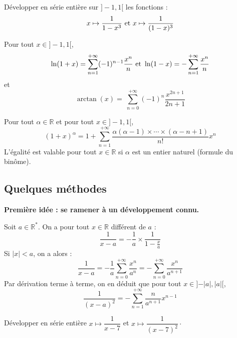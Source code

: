 \documentclass[french,11pt,twoside]{VcCours}
\begin{document}
\begin{ApplicationDirecte}{} Développer en série entière sur $]-1,1[$ les fonctions :
$$ x \mapsto \dfrac{1}{1-x^3} \hbox{ et } x \mapsto \dfrac{1}{(1-x)^3}$$
\end{ApplicationDirecte}

\begin{Proposition}{} Pour tout $x \in ]-1,1[$,
$$ \ln(1+x) = \sum_{n=1}^{+ \infty} (-1)^{n-1} \dfrac{x^n}{n} \hbox{ et } \ln(1-x) = -\sum_{n=1}^{+ \infty} \dfrac{x^n}{n}$$
et 
$$ \arctan(x)= \ \sum_{n=0}^{+ \infty} (-1)^n \frac{x^{2n+1}}{2n+1} $$
\end{Proposition}

\begin{Demonstration}{}
\vspace{7.5cm}
\end{Demonstration}

\begin{Theoreme}{} Pour tout $\alpha \in \mathbb{R}$ et pour tout $x \in ]-1,1[$,
$$ (1+x)^{\alpha} = 1 + \sum_{n=1}^{+ \infty} \dfrac{\alpha (\alpha-1) \times \cdots \times (\alpha-n+1)}{n!} x^n$$
L'égalité est valable pour tout $x \in \mathbb{R}$ si $\alpha$ est un entier naturel (formule du binôme).
\end{Theoreme}

\begin{Demonstration}{}

\vspace{12cm}
\end{Demonstration}

%
%

\newpage
\subsection{Quelques méthodes}
\textbf{Première idée : se ramener à un développement connu.}

Soit $a \in \mathbb{R}^{*}$. On a pour tout $x \in \mathbb{R}$ différent de $a$ :
$$ \dfrac{1}{x-a} = - \dfrac{1}{a} \times \dfrac{1}{1- \frac{x}{a}}$$
Si $\vert x \vert <a$, on a alors :
$$ \dfrac{1}{x-a} = - \dfrac{1}{a} \sum_{n=0}^{+ \infty} \dfrac{x^n}{a^n} = -\sum_{n=0}^{+ \infty} \dfrac{x^n}{a^{n+1}}$$
Par dérivation terme à terme, on en déduit que pour tout $x \in ]-\vert a \vert, \vert a \vert[$,
$$ \dfrac{1}{(x-a)^2} = - \sum_{n=1}^{+ \infty} \dfrac{n}{a^{n+1}} x^{n-1}$$

\begin{ApplicationDirecte}{} Développer en série entière $x \mapsto \dfrac{1}{x-7}$ et $x \mapsto \dfrac{1}{(x-7)^2}\cdot$
\end{ApplicationDirecte}
\end{document}
